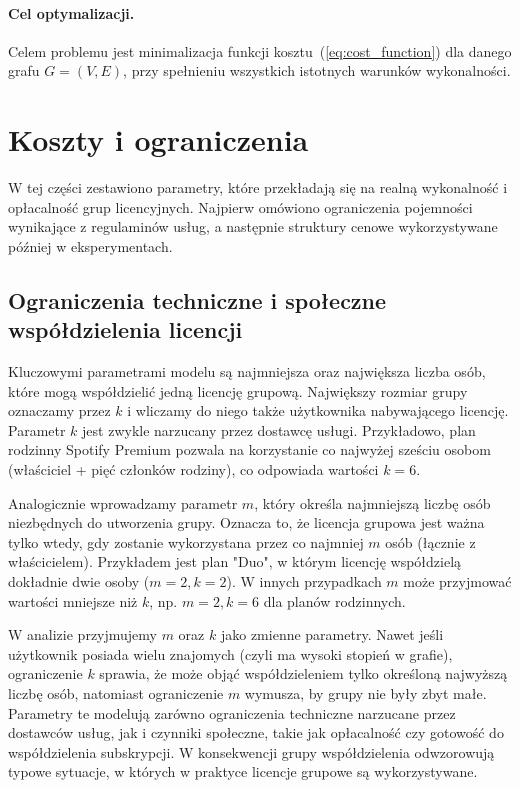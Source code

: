 \paragraph{Cel optymalizacji.}
Celem problemu jest minimalizacja funkcji kosztu~(\ref{eq:cost_function}) dla danego grafu $G=(V,E)$, przy spełnieniu wszystkich istotnych warunków wykonalności.


\section{Koszty i ograniczenia}

W tej części zestawiono parametry, które przekładają się na realną wykonalność i opłacalność grup licencyjnych. Najpierw omówiono ograniczenia pojemności wynikające z regulaminów usług, a następnie struktury cenowe wykorzystywane później w eksperymentach.

\subsection{Ograniczenia techniczne i społeczne współdzielenia licencji}

Kluczowymi parametrami modelu są najmniejsza oraz największa liczba osób, które mogą współdzielić jedną licencję grupową. Największy rozmiar grupy oznaczamy przez $k$ i wliczamy do niego także użytkownika nabywającego licencję. Parametr $k$ jest zwykle narzucany przez dostawcę usługi. Przykładowo, plan rodzinny Spotify Premium pozwala na korzystanie co najwyżej sześciu osobom (właściciel + pięć członków rodziny), co odpowiada wartości $k=6$.

Analogicznie wprowadzamy parametr $m$, który określa najmniejszą liczbę osób niezbędnych do utworzenia grupy. Oznacza to, że licencja grupowa jest ważna tylko wtedy, gdy zostanie wykorzystana przez co najmniej $m$ osób (łącznie z właścicielem). Przykładem jest plan "Duo", w którym licencję współdzielą dokładnie dwie osoby ($m=2, k=2$). W innych przypadkach $m$ może przyjmować wartości mniejsze niż $k$, np. $m=2, k=6$ dla planów rodzinnych.

W analizie przyjmujemy $m$ oraz $k$ jako zmienne parametry. Nawet jeśli użytkownik posiada wielu znajomych (czyli ma wysoki stopień w grafie), ograniczenie $k$ sprawia, że może objąć współdzieleniem tylko określoną najwyższą liczbę osób, natomiast ograniczenie $m$ wymusza, by grupy nie były zbyt małe. Parametry te modelują zarówno ograniczenia techniczne narzucane przez dostawców usług, jak i czynniki społeczne, takie jak opłacalność czy gotowość do współdzielenia subskrypcji. W konsekwencji grupy współdzielenia odwzorowują typowe sytuacje, w których w praktyce licencje grupowe są wykorzystywane.

